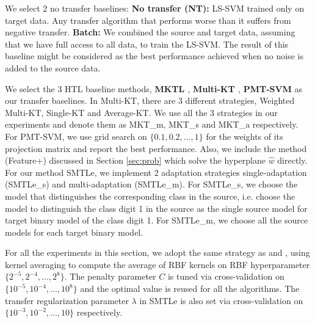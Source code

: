 We select 2 no transfer baselines:
\textbf{No transfer (NT):} LS-SVM trained only on target data. Any transfer algorithm that performs worse than it suffers from negative transfer. \textbf{Batch:} We combined the source and target data, assuming that we have full access to all data, to train the LS-SVM. The result of this baseline might be considered as the best performance achieved when no noise is added to the source data.


We select the 3 HTL baseline methods, \textbf{MKTL \cite{jie2011multiclass}}, \textbf{Multi-KT \cite{tommasi2014learning}}, \textbf{PMT-SVM} \cite{aytar2011tabula} as our transfer baselines. In Multi-KT, there are 3 different strategies, Weighted Multi-KT, Single-KT and Average-KT. We use all the 3 strategies in our experiments and denote them as MKT\_m, MKT\_s and MKT\_a respectively. For PMT-SVM, we use grid search on $\{0.1,0.2,...,1\}$ for the weights of its projection matrix and report the best performance.
Also, we include the method (Feature+) discussed in Section \ref{sec:prob} which solve the hyperplane $\hat{w}$ directly. 
For our method SMTLe, we implement 2 adaptation strategies single-adaptation (SMTLe\_s) and multi-adaptation (SMTLe\_m). For SMTLe\_s, we choose the model that distinguishes the corresponding class in the source, i.e. choose the model to distinguish the class digit 1 in the source as the single source model for target binary model of the class digit 1. For SMTLe\_m, we choose all the source models for each target binary model.





For all the experiments in this section, we adopt the same strategy as \cite{kuzborskij2013n} and \cite{tommasi2014learning}, using kernel averaging \cite{gehler2009feature} to compute the average of RBF kernels on RBF hyperparameter $\{2^{-5},2^{-4},...,2^8\}$. The penalty parameter $C$ is tuned via cross-validation on $\{10^{-5},10^{-4},...,10^8\}$ and the optimal value is reused for all the algorithms.
The transfer regularization parameter $\lambda$ in SMTLe is also set via cross-validation on $\{10^{-3},10^{-2},...,10\}$ respectively.

